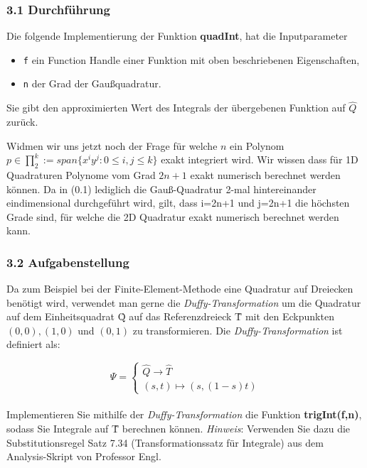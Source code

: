 \documentclass[a4paper,11pt,bibliography=totoc,listof=totoc,headinclude=true,cleardoublepage=empty,oneside]{scrbook}
\newcommand{\code}[1]{\texttt{\color{change}#1}}
\begin{document}
\subsubsection{3.1 Durchführung}

Die folgende Implementierung der Funktion \textbf{quadInt}, hat die Inputparameter
\begin{itemize}
	\item \code{f} ein Function Handle einer Funktion mit oben beschriebenen Eigenschaften,
	\item \code{n} der Grad der Gaußquadratur.
\end{itemize} 
Sie gibt den approximierten Wert des Integrals der übergebenen Funktion auf $\hat{Q}$ zurück.
{
	\color{change}		
 
		
%
}
Widmen wir uns jetzt noch der Frage für welche $n$ ein Polynom $ p \in \prod_{2}^k:=span\{x^iy^j:0 \leq i,j\leq k \} $ exakt integriert wird.		
Wir wissen dass für 1D Quadraturen Polynome vom Grad $2n+1$ exakt numerisch berechnet werden können. Da in (0.1) lediglich die Gauß-Quadratur 2-mal hintereinander eindimensional durchgeführt wird, gilt, dass i=2n+1 und j=2n+1 die höchsten Grade sind, für welche die 2D Quadratur exakt numerisch berechnet werden kann.


\subsubsection{3.2 Aufgabenstellung}
		Da zum Beispiel bei der Finite-Element-Methode eine Quadratur auf Dreiecken benötigt wird, verwendet man gerne die \textit{Duffy-Transformation} um die Quadratur auf dem Einheitsquadrat \^{Q} auf das Referenzdreieck \^{T} mit den Eckpunkten $ (0,0),(1,0)$ und $ (0,1)$ zu transformieren.
		Die \textit{Duffy-Transformation} ist definiert als:
		
		\begin{equation} 
		\Psi = \begin{cases} 
		\hat{Q} \to \hat{T} \\
		(s,t) \mapsto (s,(1-s)t)
		\end{cases} 
		\end{equation} 
		\\
		Implementieren Sie mithilfe der \textit{Duffy-Transformation} die Funktion \textbf{trigInt(f,n)}, sodass Sie Integrale auf \^{T} berechnen können.
		\textit{Hinweis}: Verwenden Sie dazu die Substitutionsregel Satz 7.34 (Transformationssatz für Integrale) aus dem Analysis-Skript von Professor Engl.
		
\end{document}
